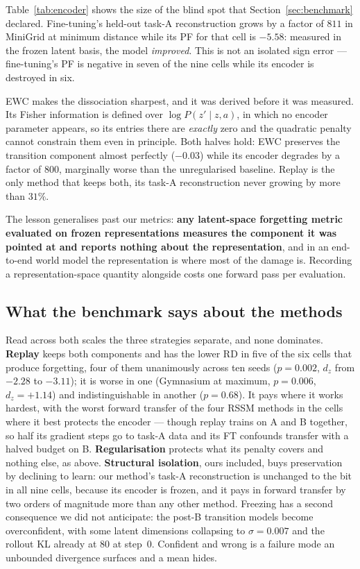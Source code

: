 \documentclass[11pt]{article}
\begin{document}
Table~\ref{tab:encoder} shows the size of the blind spot that
Section~\ref{sec:benchmark} declared. Fine-tuning's held-out task-A
reconstruction grows by a factor of $811$ in MiniGrid at minimum distance while
its PF for that cell is $-5.58$: measured in the frozen latent basis, the model
\emph{improved}. This is not an isolated sign error --- fine-tuning's PF is
negative in seven of the nine cells while its encoder is destroyed in six.

EWC makes the dissociation sharpest, and it was derived before it was measured.
Its Fisher information is defined over $\log P(z' \mid z, a)$, in which no
encoder parameter appears, so its entries there are \emph{exactly} zero and the
quadratic penalty cannot constrain them even in principle. Both halves hold:
EWC preserves the transition component almost perfectly ($-0.03$) while its
encoder degrades by a factor of $800$, marginally worse than the unregularised
baseline. Replay is the only method that keeps both, its task-A reconstruction
never growing by more than $31\%$.

The lesson generalises past our metrics: \textbf{any latent-space forgetting
metric evaluated on frozen representations measures the component it was
pointed at and reports nothing about the representation}, and in an end-to-end
world model the representation is where most of the damage is. Recording a
representation-space quantity alongside costs one forward pass per evaluation.

\subsection{What the benchmark says about the methods}
\label{sec:results:methods}

Read across both scales the three strategies separate, and none dominates.
\textbf{Replay} keeps both components and has the lower RD in five of the six
cells that produce forgetting, four of them unanimously across ten seeds
($p = 0.002$, $d_z$ from $-2.28$ to $-3.11$); it is worse in one (Gymnasium at
maximum, $p = 0.006$, $d_z = +1.14$) and indistinguishable in another
($p = 0.68$). It pays where it works hardest, with the worst forward transfer
of the four RSSM methods in the cells where it best protects the encoder ---
though replay trains on A and B together, so half its gradient steps go to
task-A data and its FT confounds transfer with a halved budget on B.
\textbf{Regularisation} protects what its penalty covers and nothing else, as
above. \textbf{Structural isolation}, ours included, buys preservation by
declining to learn: our method's task-A reconstruction is unchanged to the bit
in all nine cells, because its encoder is frozen, and it pays in forward
transfer by two orders of magnitude more than any other method. Freezing has a
second consequence we did not anticipate: the post-B transition models become
overconfident, with some latent dimensions collapsing to $\sigma = 0.007$ and
the rollout KL already at $80$ at step~0. Confident and wrong is a failure mode
an unbounded divergence surfaces and a mean hides.
\end{document}
